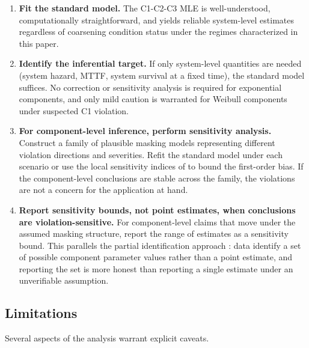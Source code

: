 \begin{enumerate}
    \item \textbf{Fit the standard model.} The C1-C2-C3 MLE is
        well-understood, computationally straightforward, and yields
        reliable system-level estimates regardless of coarsening
        condition status under the regimes characterized in this paper.

    \item \textbf{Identify the inferential target.} If only system-level
        quantities are needed (system hazard, MTTF, system survival at a
        fixed time), the standard model suffices. No correction or
        sensitivity analysis is required for exponential components, and
        only mild caution is warranted for Weibull components under
        suspected C1 violation.

    \item \textbf{For component-level inference, perform sensitivity
        analysis.} Construct a family of plausible masking models
        representing different violation directions and severities.
        Refit the standard model under each scenario or use the local
        sensitivity indices of  to bound the
        first-order bias. If the component-level conclusions are stable
        across the family, the violations are not a concern for the
        application at hand.

    \item \textbf{Report sensitivity bounds, not point estimates, when
        conclusions are violation-sensitive.} For component-level claims
        that move under the assumed masking structure, report the range
        of estimates as a sensitivity bound. This parallels the partial
        identification approach \citep{manski2003partial}: data identify
        a set of possible component parameter values rather than a
        point estimate, and reporting the set is more honest than
        reporting a single estimate under an unverifiable assumption.
\end{enumerate}

\subsection{Limitations}
\label{sec:limitations}

Several aspects of the analysis warrant explicit caveats.

